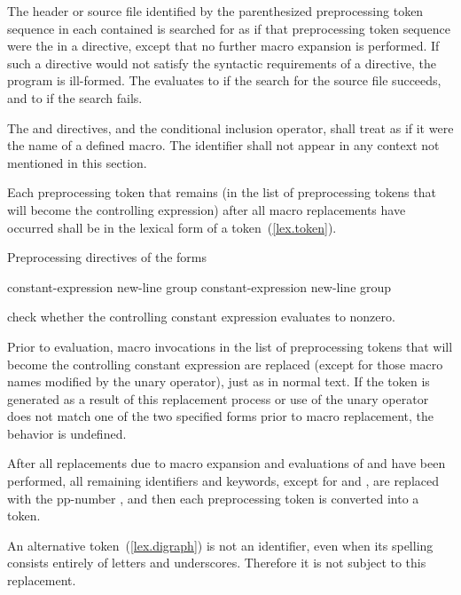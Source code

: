 \pnum
The header or source file identified by
the parenthesized preprocessing token sequence
in each contained 
is searched for as if that preprocessing token sequence
were the  in a  directive,
except that no further macro expansion is performed.
If such a directive would not satisfy the syntactic requirements
of a  directive, the program is ill-formed.
The  evaluates
to  if the search for the source file succeeds, and
to  if the search fails.

\pnum
The  and  directives, and
the  conditional inclusion operator,
shall treat  as if it were the name of a defined macro.
The identifier  shall not appear
in any context not mentioned in this section.

\pnum
Each preprocessing token that remains (in the list of preprocessing tokens that
will become the controlling expression)
after all macro replacements have occurred
shall be in the lexical form of a token~(\ref{lex.token}).

\pnum
Preprocessing directives of the forms

\begin{ncbnftab}
%
\>\>constant-expression new-line group\opt\br
{}%
\>\>constant-expression new-line group\opt
\end{ncbnftab}

check whether the controlling constant expression evaluates to nonzero.

\pnum
Prior to evaluation,
macro invocations in the list of preprocessing tokens
that will become the controlling constant expression
are replaced
(except for those macro names modified by the
unary operator),
just as in normal text.
If the token
is generated as a result of this replacement process
or use of the
unary operator does not match one of the two specified forms
prior to macro replacement,
the behavior is undefined.

\pnum
After all replacements due to macro expansion and
evaluations of  and
have been performed,
all remaining identifiers and keywords,
except for
and
,
are replaced with the pp-number
,
and then each preprocessing token is converted into a token.
\begin{note}
An alternative
token~(\ref{lex.digraph}) is not an identifier,
even when its spelling consists entirely of letters and underscores.
Therefore it is not subject to this replacement.
\end{note}

